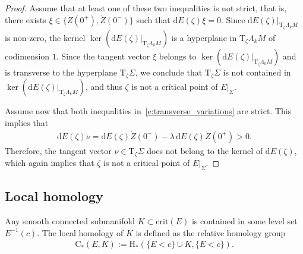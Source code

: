 \documentclass[reqno]{amsart}
\numberwithin{equation}{section}
\theoremstyle{personal}%
\theoremstyle{definition}
\newcommand{\diff}{\mathrm{d}}
\newcommand{\Tan}{\mathrm{T}}
\newcommand{\crit}{\mathrm{crit}}
\newcommand{\Hom}{\mathrm{H}}
\newcommand{\Loc}{\mathrm{C}}
\begin{document}
\begin{proof}
Assume that at least one of these two inequalities is not strict, that is, there exists $\xi\in\{\dot Z(0^+),\dot Z(0^-)\}$ such that $\diff E(\zeta)\xi=0$. Since $\diff E(\zeta)|_{\Tan_\zeta\Lambda_kM}$ is non-zero, the kernel $\ker(\diff E(\zeta)|_{\Tan_\zeta\Lambda_kM})$ is a hyperplane in $\Tan_\zeta\Lambda_kM$ of codimension $1$. Since the tangent vector $\xi$ belongs to $\ker(\diff E(\zeta)|_{\Tan_\zeta\Lambda_kM})$ and is transverse to the hyperplane $\Tan_\zeta\Sigma$, we conclude that $\Tan_\zeta\Sigma$ is not contained in $\ker(\diff E(\zeta)|_{\Tan_\zeta\Lambda_kM})$, and thus $\zeta$ is not a critical point of $E|_\Sigma$.

Assume now that both inequalities in~\eqref{e:transverse_variations} are strict. This implies that
\begin{align*}
\diff E(\zeta)\nu
=
\diff E(\zeta)\dot Z(0^-) - \lambda\,\diff E(\zeta)\dot Z(0^+)>0.
\end{align*}
Therefore, the tangent vector $\nu\in\Tan_\zeta\Sigma$ does not belong to the kernel of $\diff E(\zeta)$, which again implies that $\zeta$ is not a critical point of $E|_\Sigma$.
\end{proof}

\subsection{Local homology}

Any smooth connected submanifold $K\subset \crit(E)$ is contained in some level set $E^{-1}(c)$. The local homology of $K$ is defined as the relative homology group
\begin{align*}
\Loc_*(E,K):=\Hom_*(\{E<c\}\cup K,\{E<c\}).
\end{align*}
\end{document}
